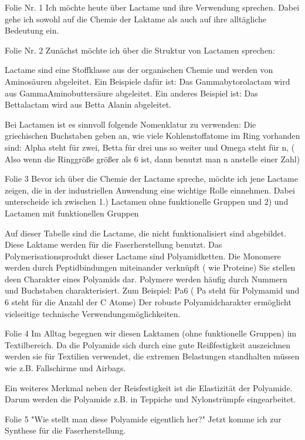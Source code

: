 \documentclass{article}
\begin{document}
Folie Nr. 1
Ich möchte heute über Lactame und ihre Verwendung sprechen. 
Dabei gehe ich sowohl auf die Chemie der Laktame als auch auf ihre alltägliche Bedeutung ein. 


Folie Nr. 2
Zunächst möchte ich über die Struktur von Lactamen sprechen: 
	
	Lactame sind eine Stoffklasse aus der organischen Chemie und werden von Aminosäuren abgeleitet.
	Ein Beispiele dafür ist: 
		Das Gammabytorolactam wird aus GammaAminobuttersäure abgeleitet.
	Ein anderes Beispiel ist: 
		Das Bettalactam wird aus Betta Alanin abgeleitet. 

Bei Lactamen ist es sinnvoll folgende Nomenklatur zu verwenden: 
		Die griechischen Buchstaben geben an, wie viele Kohlenstoffatome im Ring vorhanden sind: 
		Alpha steht für zwei, Betta für drei uns so weiter und Omega steht für n, ( Also wenn die Ringgröße größer als 6 ist, dann benutzt man n anstelle einer Zahl)


Folie 3
Bevor ich über die Chemie der Lactame spreche, möchte ich jene Lactame zeigen, die in der industriellen Anwendung eine wichtige Rolle einnehmen. Dabei unterscheide ich zwischen 
		1.) Lactamen ohne funktionelle Gruppen und
		2)  und Lactamen mit funktionellen Gruppen

Auf dieser Tabelle sind die Lactame, die nicht funktionalisiert sind abgebildet. 
Diese Laktame werden für die Faserherstellung benutzt. 
Das Polymerisationsprodukt dieser Lactame sind Polyamidketten. 
Die Monomere werden durch Peptidbindungen miteinander verknüpft ( wie Proteine)
Sie stellen deen Charakter eines Polyamids dar. 
Polymere werden häufig durch Nummern und Buchstaben charakterisiert. Zum Beispiel: Pa6 ( Pa steht für Polymamid und 6 steht für die Anzahl der C Atome)
Der robuste Polyamidcharakter ermöglicht vielseitige technische Verwendungsmöglichkeiten. 


Folie 4
Im Alltag begegnen wir diesen Laktamen (ohne funktionelle Gruppen) im Textilbereich.
Da die Polyamide sich durch eine gute Reißfestigkeit auszeichnen werden sie für Textilien verwendet, die extremen Belastungen standhalten müssen wie z.B. Fallschirme und Airbags.

Ein weiteres Merkmal neben der Reisfestigkeit ist die Elastizität der Polyamide. Darum werden die Polyamide z.B. in Teppiche und Nylonstrümpfe eingearbeitet. 



Folie 5
"Wie stellt man diese Polyamide eigentlich her?"
Jetzt komme ich zur Synthese für die Faserherstellung.
\end{document}
